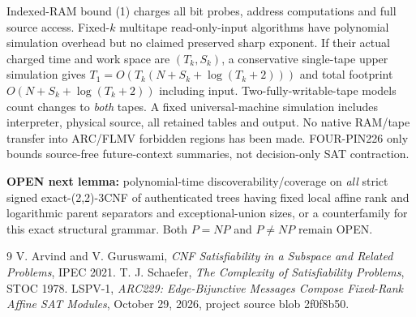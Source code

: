 \documentclass[11pt]{article}
\begin{document}
Indexed-RAM bound (1) charges all bit probes, address computations and full source access. Fixed-$k$ multitape read-only-input algorithms have polynomial simulation overhead but no claimed preserved sharp exponent. If their actual charged time and work space are $(T_k,S_k)$, a conservative single-tape upper simulation gives $T_1=O(T_k(N+S_k+\log(T_k+2)))$ and total footprint $O(N+S_k+\log(T_k+2))$ including input. Two-fully-writable-tape models count changes to \emph{both} tapes. A fixed universal-machine simulation includes interpreter, physical source, all retained tables and output. No native RAM/tape transfer into ARC/FLMV forbidden regions has been made. FOUR-PIN226 only bounds source-free future-context summaries, not decision-only SAT contraction.

\noindent\textbf{OPEN next lemma:} polynomial-time discoverability/coverage on \emph{all} strict signed exact-(2,2)-3CNF of authenticated trees having fixed local affine rank and logarithmic parent separators and exceptional-union sizes, or a counterfamily for this exact structural grammar. Both $P=NP$ and $P\ne NP$ remain OPEN.
\begin{thebibliography}{9}
 V. Arvind and V. Guruswami, \emph{CNF Satisfiability in a Subspace and Related Problems}, IPEC 2021.
 T. J. Schaefer, \emph{The Complexity of Satisfiability Problems}, STOC 1978.
 LSPV-1, \emph{ARC229: Edge-Bijunctive Messages Compose Fixed-Rank Affine SAT Modules}, October 29, 2026, project source blob 2f0f8b50.
\end{thebibliography}
\end{document}
